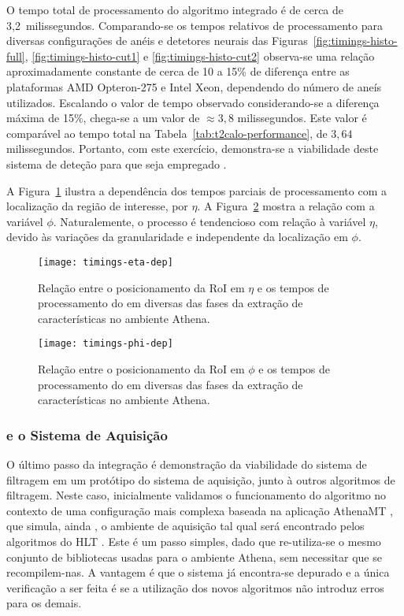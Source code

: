 O tempo total de processamento do algoritmo integrado é de cerca de
3,2~milissegundos. Comparando-se os tempos relativos de processamento para
diversas configurações de anéis e detetores neurais das
Figuras~\ref{fig:timings-histo-full}, \ref{fig:timings-histo-cut1} e
\ref{fig:timings-histo-cut2} observa-se uma relação aproximadamente constante
de cerca de 10 a 15\% de diferença entre as plataformas AMD Opteron-275 e
Intel Xeon, dependendo do número de aneís utilizados. Escalando o valor de
tempo observado considerando-se a diferença máxima de 15\%, chega-se a um
valor de $\approx 3,8$ milissegundos. Este valor é comparável ao tempo total
na Tabela~\ref{tab:t2calo-performance}, de $3,64$ milissegundos. Portanto, com
este exercício, demonstra-se a viabilidade deste sistema de deteção para que
seja empregado .

A Figura~\ref{fig:timings-eta-dep} ilustra a dependência dos tempos parciais
de processamento com a localização da região de interesse, por $\eta$. A
Figura~\ref{fig:timings-phi-dep} mostra a relação com a variável
$\phi$. Naturalemente, o processo é tendencioso com relação à variável $\eta$,
devido às variações da granularidade e independente da localização em $\phi$.

\begin{figure}
\begin{center}
\texttt{[image: timings-eta-dep]}
\end{center}
\caption{Relação entre o posicionamento da RoI em $\eta$ e os tempos de
processamento do  em diversas das fases da extração de
características no ambiente Athena.}
\label{fig:timings-eta-dep}
\end{figure}

\begin{figure}
\begin{center}
\texttt{[image: timings-phi-dep]}
\end{center}
\caption{Relação entre o posicionamento da RoI em $\phi$ e os tempos de
processamento do  em diversas das fases da extração de
características no ambiente Athena.}
\label{fig:timings-phi-dep}
\end{figure}

\subsubsection{ e o Sistema de Aquisição}

O último passo da integração é demonstração da viabilidade do sistema de
filtragem em um protótipo do sistema de aquisição, junto à outros algoritmos
de filtragem. Neste caso, inicialmente validamos o funcionamento do algoritmo
no contexto de uma configuração mais complexa baseada na aplicação AthenaMT
\cite{aa:tns-2004-2}, que simula, ainda , o ambiente de aquisição
tal qual será encontrado pelos algoritmos do HLT . Este é um passo
simples, dado que re-utiliza-se o mesmo conjunto de bibliotecas usadas para o
ambiente Athena, sem necessitar que se recompilem-nas. A vantagem é que o
sistema já encontra-se depurado e a única verificação a ser feita é se a
utilização dos novos algoritmos não introduz erros para os demais.

